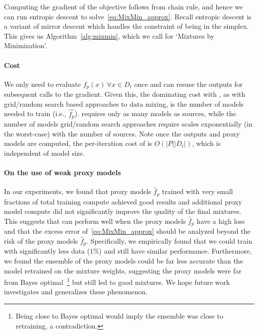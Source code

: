 Computing the gradient of the objective follows from chain rule, and hence we can run entropic descent to solve~\ref{eq:MixMin_approx}. Recall entropic descent is a variant of mirror descent which handles the constraint of being in the simplex.  This gives us Algorithm~\ref{alg:mixmin}, which we call \method for `Mixtures by Minimization'. 


\paragraph{Cost} We only need to evaluate $f_p(x)~\forall x \in D_t$ once and can resuse the outputs for subsequent calls to the gradient. Given this, the dominating cost with \methodnospace, as with grid/random search based approaches to data mixing, is the number of models needed to train (i.e., $\hat{f_p}$). \method requires only as many models as sources, while the number of models grid/random search approaches require scales exponentially (in the worst-case) with the number of sources. Note once the outputs and proxy models are computed, the per-iteration cost of \method is $O(|P||D_t|)$, which is independent of model size.

\paragraph{On the use of weak proxy models} In our experiments, we found that proxy models $\hat{f}_p$ trained with very small fractions of total training compute achieved good results and additional proxy model compute did not significantly improve the quality of the final mixtures. This suggests that \method can perform well when the proxy models $\hat{f}_p$ have a high loss and that the excess error of~\ref{eq:MixMin_approx} should be analyzed beyond the risk of the proxy models $\hat{f}_p$. Specifically, we empirically found that we could train with significantly less data ($1\%$) and still have similar \method performance. Furthermore, we found the ensemble of the proxy models could be far less accurate than the model retrained on the \method mixture weights, suggesting the proxy models were far from Bayes optimal~\footnote{Being close to Bayes optimal would imply the ensemble was close to retraining, a contradiction.} but still led to good mixtures. We hope future work investigates and generalizes these phenomenon.
















